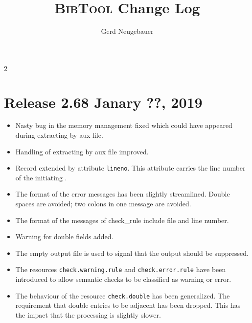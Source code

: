 \documentclass[11pt,a4paper]{scrartcl}
\newenvironment{Developers}{}{}
\newcommand\Developer[3]{}
\newcommand\rsc[1]{\texttt{#1}}
\newcommand\BibTool{\textsc{BibTool}}
\newenvironment{Release}[2]{%
  \def\tmp{#2}%
  \section*{Release #1 \ifx\tmp\empty\else{\normalsize[#2]}\fi}
  \begin{itemize}
}{\end{itemize}}
\newenvironment{Fix}[1]{\item }{}
\newenvironment{New}[1]{\item }{}
\newenvironment{Update}[1]{\item }{}
\begin{document}

\title{\BibTool{} Change Log}
\author{Gerd Neugebauer}
\date{}
\maketitle

\begin{Developers}
  \Developer{gene}{Gerd Neugebauer}{gene@gerd-neugebauer.de}
\end{Developers}

\begin{multicols}2\RaggedRight

 \begin{Release}{2.68}{Janary ??, 2019}
  \begin{Fix}{gene}
    Nasty bug in the memory management fixed which could have appeared
    during extracting by aux file.
  \end{Fix}
  \begin{Update}{gene}
    Handling of extracting by aux file improved.
  \end{Update}
  \begin{New}{gene}
    Record extended by attribute \texttt{lineno}.
    This attribute carries the line number of the initiating \@.
  \end{New}
  \begin{Update}{gene}
    The format of the error messages has been slightly streamlined.
    Double spaces are avoided; two colons in one message are avoided.
  \end{Update}
  \begin{Update}{gene}
    The format of the messages of check_rule include file and line number.
  \end{Update}
  \begin{New}{gene}
    Warning for double fields added.
  \end{New}
  \begin{New}{gene}
    The empty output file is used to signal that the output should be
    suppressed.
  \end{New}
  \begin{New}{gene}
    The resources \rsc{check.warning.rule} and \rsc{check.error.rule}
    have been introduced to allow semantic checks to be classified as
    warning or error.
  \end{New}
  \begin{New}{gene}
    The behaviour of the resource \rsc{check.double} has been
    generalized. The requirement that double entries to be adjacent
    has been dropped. This has the impact that the processing is
    slightly slower.
  \end{New}
 \end{Release}


\end{multicols}
\end{document}
